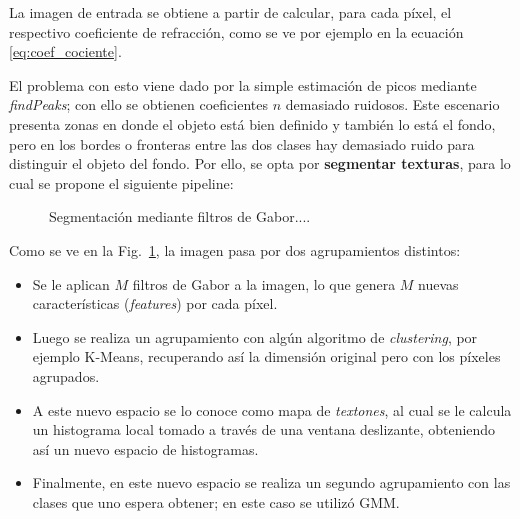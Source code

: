 La imagen de entrada se obtiene a partir de calcular, para cada píxel, el respectivo coeficiente de refracción, como se ve por ejemplo en la ecuación \eqref{eq:coef_cociente}.

El problema con esto viene dado por la simple estimación de picos mediante \textit{findPeaks}; con ello se obtienen coeficientes \(n\) demasiado ruidosos. Este escenario presenta zonas en donde el objeto está bien definido y también lo está el fondo, pero en los bordes o fronteras entre las dos clases hay demasiado ruido para distinguir el objeto del fondo. Por ello, se opta por \textbf{segmentar texturas}, para lo cual se propone el siguiente pipeline:

\begin{figure}[H]
    \centering
    \resizebox{0.8\textwidth}{!}{        }
    \caption{Segmentación mediante filtros de Gabor....}
    \label{fig:maskv1_gabor}
\end{figure}

Como se ve en la Fig.~\ref{fig:maskv1_gabor}, la imagen pasa por dos agrupamientos distintos:

\begin{itemize}
    \item Se le aplican \(M\) filtros de Gabor a la imagen, lo que genera \(M\) nuevas características (\textit{features}) por cada píxel.
    \item Luego se realiza un agrupamiento con algún algoritmo de \textit{clustering}, por ejemplo K-Means, recuperando así la dimensión original pero con los píxeles agrupados.
    \item A este nuevo espacio se lo conoce como mapa de \textit{textones}, al cual se le calcula un histograma local tomado a través de una ventana deslizante, obteniendo así un nuevo espacio de histogramas.
    \item Finalmente, en este nuevo espacio se realiza un segundo agrupamiento con las clases que uno espera obtener; en este caso se utilizó GMM.
\end{itemize}
